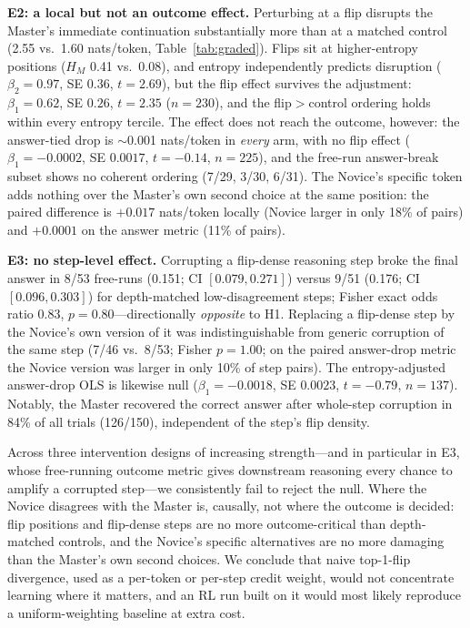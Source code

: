 \documentclass[times, 10pt,twocolumn]{article}
\begin{document}
\textbf{E2: a local but not an outcome effect.} Perturbing at a flip disrupts
the Master's immediate continuation substantially more than at a matched
control (2.55 vs.\ 1.60 nats/token, Table~\ref{tab:graded}). Flips sit at
higher-entropy positions ($H_M$ 0.41 vs.\ 0.08), and entropy independently
predicts disruption ($\beta_2 = 0.97$, SE $0.36$, $t = 2.69$), but the flip
effect survives the adjustment: $\beta_1 = 0.62$, SE $0.26$, $t = 2.35$
($n{=}230$), and the flip$>$control ordering holds within every entropy
tercile. The effect does not reach the outcome, however: the answer-tied drop
is $\sim$0.001 nats/token in \emph{every} arm, with no flip effect
($\beta_1 = -0.0002$, SE $0.0017$, $t = -0.14$, $n{=}225$),
and the free-run answer-break subset shows no coherent ordering (7/29, 3/30,
6/31). The Novice's specific token adds nothing over the Master's own second
choice at the same position: the paired difference is $+0.017$ nats/token
locally (Novice larger in only 18\% of pairs) and $+0.0001$ on the answer
metric (11\% of pairs).

\textbf{E3: no step-level effect.} Corrupting a flip-dense reasoning step broke
the final answer in 8/53 free-runs (0.151; CI $[0.079, 0.271]$) versus 9/51
(0.176; CI $[0.096, 0.303]$) for depth-matched low-disagreement steps; Fisher
exact odds ratio 0.83, $p = 0.80$---directionally \emph{opposite} to H1.
Replacing a flip-dense step by the Novice's own version of it was
indistinguishable from generic corruption of the same step (7/46 vs.\ 8/53;
Fisher $p = 1.00$; on the paired answer-drop metric the Novice version was
larger in only 10\% of step pairs). The entropy-adjusted answer-drop OLS is
likewise null ($\beta_1 = -0.0018$, SE $0.0023$, $t = -0.79$, $n{=}137$). Notably, the Master
recovered the correct answer after whole-step corruption in 84\% of all trials
(126/150), independent of the step's flip density.




Across three intervention designs of increasing strength---and in particular in
E3, whose free-running outcome metric gives downstream reasoning every chance
to amplify a corrupted step---we consistently fail to reject the null. Where
the Novice disagrees with the Master is, causally, not where the outcome is
decided: flip positions and flip-dense steps are no more outcome-critical than
depth-matched controls, and the Novice's specific alternatives are no more
damaging than the Master's own second choices. We conclude that naive
top-1-flip divergence, used as a per-token or per-step credit weight, would
not concentrate learning where it matters, and an RL run built on it would
most likely reproduce a uniform-weighting baseline at extra cost.
\end{document}
